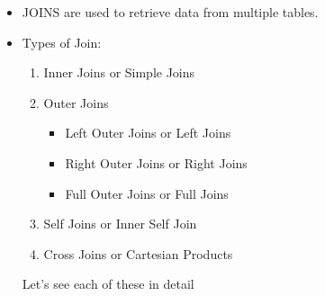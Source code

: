 \setlength{\columnsep}{3pt}
\begin{flushleft}
	
	\begin{itemize}
		\item JOINS are used to retrieve data from multiple tables. 
		\item Types of Join:
		\begin{enumerate}
			\item Inner Joins or Simple Joins
			\item Outer Joins
			\begin{itemize}
				\item Left Outer Joins or Left Joins
				\item Right Outer Joins or Right Joins
				\item Full Outer Joins or Full Joins
			\end{itemize}
			\item Self Joins or Inner Self Join
			\item Cross Joins or Cartesian Products
		\end{enumerate}
		
		Let's see each of these in detail
		
	\end{itemize}
	
\end{flushleft}

\newpage

